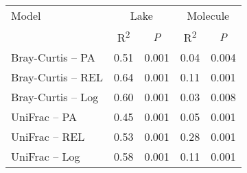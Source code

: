 \begin{table}[ht]
\centering
\begin{tabular}{l r r r r }
  \hline
\hline
  Model & \multicolumn{2}{c}{Lake} & \multicolumn{2}{c}{Molecule} \\
  & \multicolumn{1}{c}{R\textsuperscript{2}} & 
                          \multicolumn{1}{c}{\emph{P}} & 
                          \multicolumn{1}{c}{R\textsuperscript{2}} & 
                          \multicolumn{1}{c}{\emph{P}} \\
 \hline
Bray-Curtis -- PA & 0.51 & 0.001 & 0.04 & 0.004 \\ 
  Bray-Curtis -- REL & 0.64 & 0.001 & 0.11 & 0.001 \\ 
  Bray-Curtis -- Log & 0.60 & 0.001 & 0.03 & 0.008 \\ 
  UniFrac -- PA & 0.45 & 0.001 & 0.05 & 0.001 \\ 
  UniFrac -- REL & 0.53 & 0.001 & 0.28 & 0.001 \\ 
  UniFrac -- Log & 0.58 & 0.001 & 0.11 & 0.001 \\ 
   \hline
\end{tabular}
\end{table}
